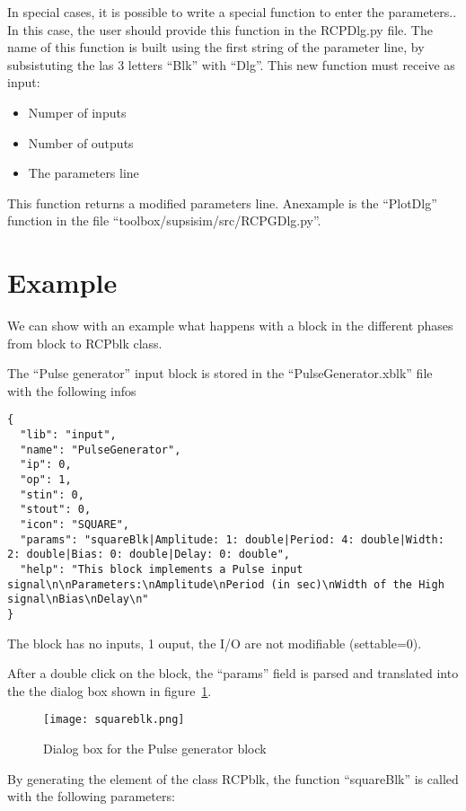 In special cases, it is possible to write a special function to 
enter the parameters.. In this case, the user should provide this function in 
the RCPDlg.py file.
The name of this function is built using the first string of the parameter 
line, by subsistuting the las 3 letters ``Blk'' with ``Dlg''. This new function 
must receive as input:

\begin{itemize}
\item Numper of inputs
\item Number of outputs
\item The parameters line
\end{itemize}

This function returns a modified parameters line. Anexample is the ``PlotDlg'' 
function in the file ``toolbox/supsisim/src/RCPGDlg.py''.

\section{Example}
We can show with an example what happens with a block in the different phases 
from block to RCPblk class.

The ``Pulse generator'' input block is stored in the ``PulseGenerator.xblk'' 
file with 
the following infos

\begin{verbatim}
{
  "lib": "input",
  "name": "PulseGenerator",
  "ip": 0,
  "op": 1,
  "stin": 0,
  "stout": 0,
  "icon": "SQUARE",
  "params": "squareBlk|Amplitude: 1: double|Period: 4: double|Width: 2: double|Bias: 0: double|Delay: 0: double",
  "help": "This block implements a Pulse input signal\n\nParameters:\nAmplitude\nPeriod (in sec)\nWidth of the High signal\nBias\nDelay\n"
}
\end{verbatim}

The block has no inputs, 1 ouput, the I/O are not modifiable (settable=0).

After a double click on the block, the ``params'' field is parsed and 
translated 
into the the dialog box shown in figure~\ref{Fig:squareblk}.

 \begin{figure}[htbp]	
 \centering
 \texttt{[image: squareblk.png]}
 \caption{Dialog box for the Pulse generator block}
 \label{Fig:squareblk}
 \end{figure}

 By generating the element of the class RCPblk, the function ``squareBlk'' is 
called with the following parameters:
 
